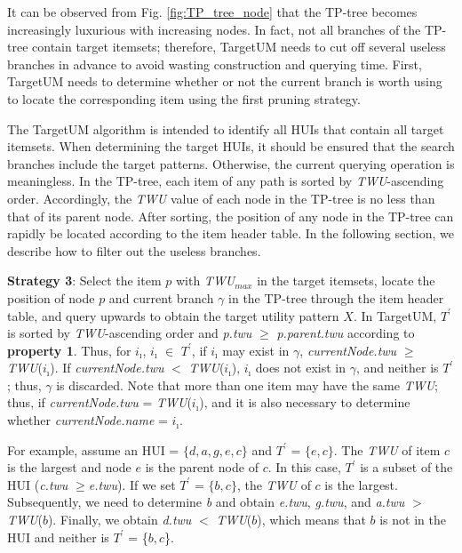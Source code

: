 \documentclass[journal]{IEEEtran}
\begin{document}
It can be observed from Fig. \ref{fig:TP_tree_node} that the TP-tree becomes increasingly luxurious with increasing nodes. In fact, not all branches of the TP-tree contain target itemsets; therefore, TargetUM needs to cut off several useless branches in advance to avoid wasting construction and querying time. First, TargetUM needs to determine whether or not the current branch is worth using to locate the corresponding item using the first pruning strategy.


The TargetUM algorithm is intended to identify all HUIs that contain all target itemsets. When determining the target HUIs, it should be ensured that the search branches include the target patterns. Otherwise, the current querying operation is meaningless. In the TP-tree, each item of any path is sorted by \textit{TWU}-ascending order. Accordingly, the \textit{TWU} value of each node in the TP-tree is no less than that of its parent node. After sorting, the position of any node in the TP-tree can rapidly be located according to the item header table. In the following section, we describe how to filter out the useless branches.


\textbf{Strategy 3}: Select the item $p$ with \textit{TWU}$_{max}$ in the target itemsets, locate the position of node $p$ and current branch $\gamma$ in the TP-tree through the item header table, and query upwards to obtain the target utility pattern $X$. In TargetUM, $T^\prime$ is sorted by \textit{TWU}-ascending order and \textit{p.twu} $\ge$ \textit{p.parent.twu} according to \textbf{property 1}. Thus, for $i_\imath$, $i_\imath$ $\in$ $T^\prime$, if $i_\imath$ may exist in $\gamma$,  \textit{currentNode.twu} $\ge$ \textit{TWU}($i_\imath$). If \textit{currentNode.twu} $<$ \textit{TWU}($i_\imath$), $i_\imath$ does not exist in $\gamma$, and neither is $T^\prime$; thus, $\gamma$ is discarded. Note that more than one item may have the same \textit{TWU}; thus, if \textit{currentNode.twu} = \textit{TWU}($i_\imath$), and it is also necessary to determine whether \textit{currentNode.name} = $i_\imath$.


For example, assume an HUI = $\{$$d,a,g,e,c$$\}$ and \textit{$T^\prime$} = $\{$$e,c$$\}$. The \textit{TWU} of item $c$ is the largest and node $e$ is the parent node of $c$. In this case, $T^\prime$ is a subset of the HUI (\textit{c.twu} $\ge$\textit{e.twu}). If we set $T^\prime$ = $\{$$b,c$$\}$, the \textit{TWU} of $c$ is the largest. Subsequently, we need to determine \textit{b} and obtain \textit{e.twu}, \textit{g.twu}, and \textit{a.twu} $>$ \textit{TWU}($b$). Finally, we obtain \textit{d.twu} $<$ \textit{TWU}($b$), which means that $b$ is not in the HUI and neither is $T^\prime$ = \{$b, c$\}.
\end{document}

